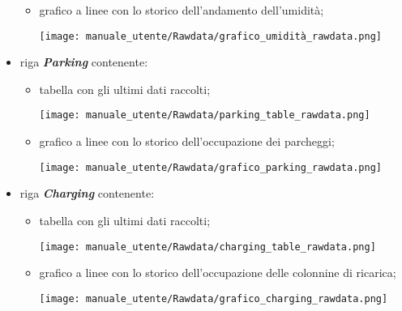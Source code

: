\begin{itemize}
\begin{itemize}
\begin{center}
        \end{center}
        \item grafico a linee con lo storico dell'andamento dell'umidità;
        \begin{center}
            \texttt{[image: manuale\_utente/Rawdata/grafico\_umidità\_rawdata.png]}
        \end{center}
    \end{itemize}
    \item riga \textit{\textbf{Parking}} contenente:
    \begin{itemize}
        \item tabella con gli ultimi dati raccolti;
        \begin{center}
            \texttt{[image: manuale\_utente/Rawdata/parking\_table\_rawdata.png]}
        \end{center}
        \item grafico a linee con lo storico dell'occupazione dei parcheggi;
        \begin{center}
            \texttt{[image: manuale\_utente/Rawdata/grafico\_parking\_rawdata.png]}
        \end{center}
    \end{itemize}
    \item riga \textit{\textbf{Charging}} contenente:
    \begin{itemize}
        \item tabella con gli ultimi dati raccolti;
        \begin{center}
            \texttt{[image: manuale\_utente/Rawdata/charging\_table\_rawdata.png]}
        \end{center}
        \item grafico a linee con lo storico dell'occupazione delle colonnine di ricarica;
        \begin{center}
            \texttt{[image: manuale\_utente/Rawdata/grafico\_charging\_rawdata.png]}
        \end{center}
    \end{itemize}

\end{itemize}
